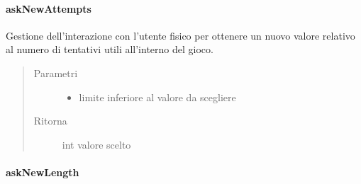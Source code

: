 \documentclass[letterpaper,10pt,italian,openany,oneside]{sphinxmanual}
\begin{document}
\paragraph{askNewAttempts}
\label{\detokenize{source/it/unicam/cs/pa/mastermind/ui/StartView:asknewattempts}}

\begin{fulllineitems}
\label{\detokenize{source/it/unicam/cs/pa/mastermind/ui/StartView:it.unicam.cs.pa.mastermind.ui.StartView.askNewAttempts(int)}}
Gestione dell’interazione con l’utente fisico per ottenere un nuovo valore relativo al numero di tentativi utili all’interno del gioco.
\begin{quote}\begin{description}
\item[{Parametri}] \leavevmode\begin{itemize}
\item {} 
 \textendash{} limite inferiore al valore da scegliere

\end{itemize}

\item[{Ritorna}] \leavevmode
int valore scelto

\end{description}\end{quote}

\end{fulllineitems}



\paragraph{askNewLength}
\label{\detokenize{source/it/unicam/cs/pa/mastermind/ui/StartView:asknewlength}}
\end{document}
